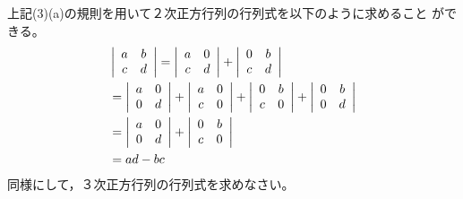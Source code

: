 \documentclass[twocolumn,11pt]{jarticle}
\begin{document}
\nquestion
上記(3)(a)の規則を用いて２次正方行列の行列式を以下のように求めること
ができる。
\begin{align}
&  \left|
    \begin{array}{cc}
      a & b \\
      c & d
    \end{array}\right|
  =
  \left|
    \begin{array}{cc}
      a & 0 \\
      c & d
    \end{array}\right|
  +
  \left|
    \begin{array}{cc}
      0 & b \\
      c & d
    \end{array}\right|\notag\\
  &=
  \left|
    \begin{array}{cc}
      a & 0 \\
      0 & d
    \end{array}\right|
  +
  \left|
    \begin{array}{cc}
      a & 0 \\
      c & 0
    \end{array}\right|%
  +
  \left|
    \begin{array}{cc}
      0 & b\\
      c & 0
    \end{array}\right|
  +
  \left|
    \begin{array}{cc}
      0 & b\\
      0 & d
    \end{array}\right|\notag\\
  &=
  \left|
    \begin{array}{cc}
      a & 0 \\
      0 & d
    \end{array}\right|
  +
  \left|
    \begin{array}{cc}
      0 & b\\
      c & 0
    \end{array}\right|\notag\\
  &= ad - bc\notag
\end{align}
同様にして，３次正方行列の行列式を求めなさい。
\end{document}
